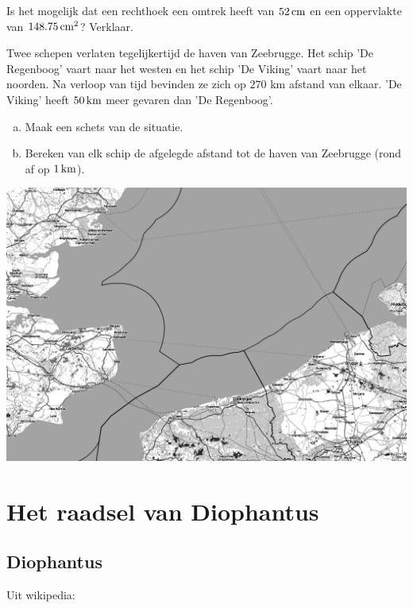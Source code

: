 \documentclass[12pt]{article}
\begin{document}
\begin{oefening}
  Is het mogelijk dat een rechthoek een omtrek heeft van $52 \cm$ en een oppervlakte van $148.75\cm^2$? Verklaar.
\end{oefening}


\begin{oefening}
  Twee schepen verlaten tegelijkertijd de haven van Zeebrugge. Het schip 'De Regenboog' vaart naar het westen en het schip 'De Viking' vaart naar het noorden. Na verloop van tijd bevinden ze zich op $270$ km afstand van elkaar. 'De Viking' heeft $50 \km$ meer gevaren dan 'De Regenboog'.
  \begin{enumerate}[(a)]
  \item Maak een schets van de situatie.
  \item Bereken van elk schip de afgelegde afstand tot de haven van Zeebrugge (rond af op $1 \km$).
  \end{enumerate}
  \begin{center}
    \includegraphics[width=\textwidth]{zeebrugge}
  \end{center}
\end{oefening}

\pagebreak

\section*{Het raadsel van Diophantus}

\subsection*{Diophantus}

Uit wikipedia:
\end{document}
